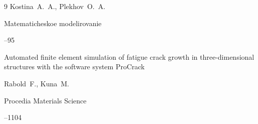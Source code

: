 \begin{thebibliography}{9}
\by Kostina~A.~A., Plekhov~O.~A.

\jour Matematicheskoe modelirovanie



--95 




\paper Automated finite element simulation of fatigue crack growth in three-dimensional structures with the software system ProCrack

\by Rabold~F., Kuna~M.

\jour Procedia Materials Science



--1104





\end{thebibliography}



\EngDate



\renewcommand{\baselinestretch}{0.9}



